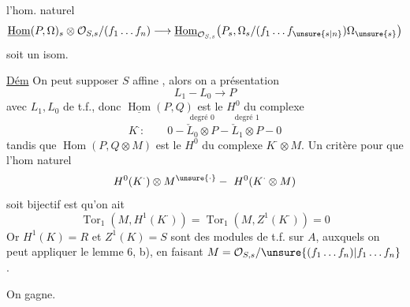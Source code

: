 l'hom. naturel
\[
\underline{\operatorname{Hom}}(P,\Omega)_s\otimes\mathcal O_{S,s}/(f_1\ldots f_n)\longrightarrow
\underline{\operatorname{Hom}}_{\mathcal O_{S,s}}\bigl(P_s,\Omega_s/(f_1\ldots f_{\unsure{s|n}})\Omega_{\unsure{s}}\bigr)
\]
soit un isom.

\uline{Dém} On peut supposer $S$ affine , alors on a  présentation
\[
L_1\mathbin{-}L_0\longrightarrow P
\]
avec $L_1,L_0$  de t.f., donc $\underline{\operatorname{Hom}}(P,Q)$ est le $H^0$ du complexe
\[
K^{\cdot}:\qquad 0-\overset{\text{degré }0}{\check L_0\otimes P}-\overset{\text{degré }1}{\check L_1\otimes P}-0
\]
tandis que $\operatorname{Hom}(P,Q\otimes M)$ est le $H^0$ du complexe $K^{\cdot}\otimes M$. Un critère pour que l'hom naturel
\[
H^0(K^{\cdot})\otimes M^{\unsure{\cdot}}-\ H^0(K^{\cdot}\otimes M)
\]
soit bijectif est qu'on ait
\[
\operatorname{Tor}_1(M,H^1(K^{\cdot}))=\operatorname{Tor}_1(M,Z^1(K^{\cdot}))=0
\]
Or $H^1(K)=R$ et $Z^1(K)=S$ sont des modules de t.f. sur $A$, auxquels on peut appliquer le  lemme 6, b), en faisant $M=\mathcal O_{S,s}/\unsure{(f_1\ldots f_n)|f_1\ldots f_n}$.

On gagne.


